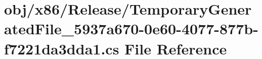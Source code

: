 \hypertarget{TemporaryGeneratedFile__5937a670-0e60-4077-877b-f7221da3dda1_8cs}{\section{obj/x86/\-Release/\-Temporary\-Generated\-File\-\_\-5937a670-\/0e60-\/4077-\/877b-\/f7221da3dda1.cs File Reference}
\label{TemporaryGeneratedFile__5937a670-0e60-4077-877b-f7221da3dda1_8cs}
}
